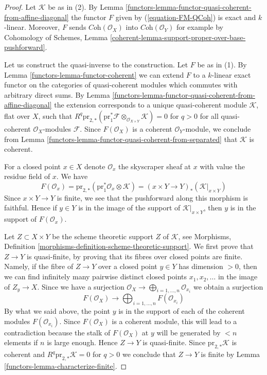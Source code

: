 \begin{proof}

Let $\mathcal{K}$ be as in (2). By
Lemma \ref{functors-lemma-functor-quasi-coherent-from-affine-diagonal}
the functor $F$ given by (\ref{equation-FM-QCoh}) is exact and $k$-linear.
Moreover, $F$ sends $\textit{Coh}(\mathcal{O}_X)$ into
$\textit{Coh}(\mathcal{O}_Y)$ for example by
Cohomology of Schemes, Lemma
\ref{coherent-lemma-support-proper-over-base-pushforward}.

\medskip\noindent
Let us construct the quasi-inverse to the construction. Let $F$ be
as in (1). By Lemma \ref{functors-lemma-functor-coherent} we can extend $F$
to a $k$-linear exact functor on the
categories of quasi-coherent modules which commutes with arbitrary direct sums.
By Lemma \ref{functors-lemma-functor-quasi-coherent-from-affine-diagonal}
the extension corresponds to a unique quasi-coherent module
$\mathcal{K}$, flat over $X$, such that
$R^q\text{pr}_{2, *}(\text{pr}_1^*\mathcal{F}
\otimes_{\mathcal{O}_{X \times Y}} \mathcal{K}) = 0$ for $q > 0$
for all quasi-coherent $\mathcal{O}_X$-modules $\mathcal{F}$.
Since $F(\mathcal{O}_X)$ is a coherent $\mathcal{O}_Y$-module, we
conclude from Lemma \ref{functors-lemma-functor-quasi-coherent-from-separated}
that $\mathcal{K}$ is coherent.

\medskip\noindent
For a closed point $x \in X$ denote $\mathcal{O}_x$ the skyscraper sheaf
at $x$ with value the residue field of $x$. We have
$$
F(\mathcal{O}_x) =
\text{pr}_{2, *}(\text{pr}_1^*\mathcal{O}_x \otimes \mathcal{K}) =
(x \times Y \to Y)_*(\mathcal{K}|_{x \times Y})
$$
Since $x \times Y \to Y$ is finite, we see that the pushforward along
this morphism is faithful. Hence if $y \in Y$ is in the image of the
support of $\mathcal{K}|_{x \times Y}$, then $y$ is in the support of
$F(\mathcal{O}_x)$.

\medskip\noindent
Let $Z \subset X \times Y$ be the scheme theoretic support $Z$ of
$\mathcal{K}$, see
Morphisms, Definition \ref{morphisms-definition-scheme-theoretic-support}.
We first prove that $Z \to Y$ is quasi-finite, by proving that its fibres
over closed points are finite. Namely, if the fibre of $Z \to Y$ over a
closed point $y \in Y$ has dimension $> 0$, then we can find infinitely
many pairwise distinct closed points $x_1, x_2, \ldots$ in the image of
$Z_y \to X$. Since we have a surjection
$\mathcal{O}_X \to \bigoplus_{i = 1, \ldots, n} \mathcal{O}_{x_i}$
we obtain a surjection
$$
F(\mathcal{O}_X) \to \bigoplus\nolimits_{i = 1, \ldots, n} F(\mathcal{O}_{x_i})
$$
By what we said above, the point $y$ is in the support of each
of the coherent modules $F(\mathcal{O}_{x_i})$. Since $F(\mathcal{O}_X)$
is a coherent module, this will lead to a contradiction because
the stalk of $F(\mathcal{O}_X)$ at $y$ will be generated by $< n$ elements
if $n$ is large enough. Hence $Z \to Y$ is quasi-finite.
Since $\text{pr}_{2, *}\mathcal{K}$ is coherent and
$R^q\text{pr}_{2, *}\mathcal{K} = 0$ for $q > 0$ we conclude
that $Z \to Y$ is finite by Lemma \ref{functors-lemma-characterize-finite}.
\end{proof}

